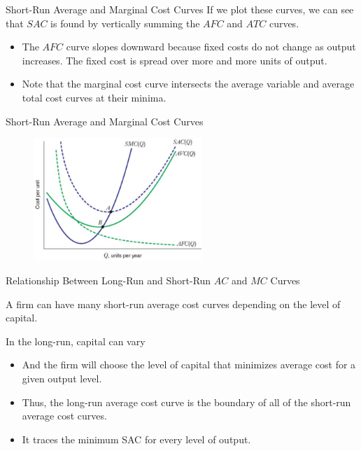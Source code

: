 \documentclass[11pt,t]{beamer}
\begin{document}
\begin{frame}{Short-Run Average and Marginal Cost Curves}
  If we plot these curves, we can see that $SAC$ is found by vertically summing the $AFC$ and $ATC$ curves.

  \begin{itemize}
    \item The $AFC$ curve slopes downward because fixed costs do not change as output increases. The fixed cost is spread over more and more units of output.
    
    \item Note that the marginal cost curve intersects the average variable and average total cost curves at their minima.
  \end{itemize}
\end{frame}

\begin{frame}{Short-Run Average and Marginal Cost Curves}
  \begin{figure}
    \includegraphics[width=240px]{figures/fig8_16.jpg}
  \end{figure}
\end{frame}

\begin{frame}{Relationship Between Long-Run and Short-Run $AC$ and $MC$ Curves}
  
  A firm can have many short-run average cost curves depending on the level of capital.

  \pause\bigskip
  In the long-run, capital can vary

  \begin{itemize}
    \item And the firm will choose the level of capital that minimizes average cost for a given output level.
    
    \item Thus, the long-run average cost curve is the boundary of all of the short-run average cost curves.
    
    \item It traces the minimum SAC for every level of output.
  \end{itemize}


\end{frame}
\end{document}
